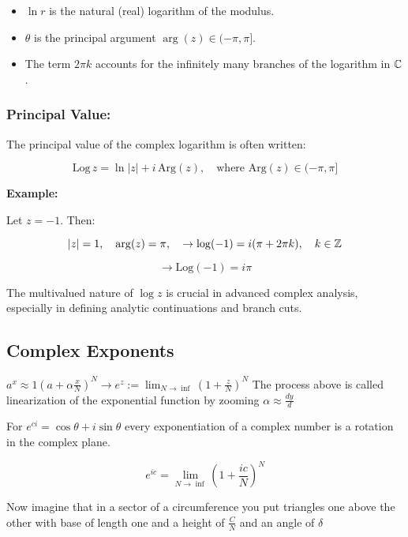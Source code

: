 \begin{itemize}
	
	\item \( \ln r \) is the natural (real) logarithm of the modulus.
	
	\item \( \theta \) is the principal argument \( \arg(z) \in (-\pi, \pi] \).
	
	\item The term \( 2\pi k \) accounts for the infinitely many branches of the logarithm in 
		  \( \mathbb{C} \).

		\end{itemize}

\subsubsection*{Principal Value:}

The principal value of the complex logarithm is often written:

\[
	\mathrm{Log}\,z = \ln |z| + i\,\mathrm{Arg}(z), \quad \text{where } \mathrm{Arg}(z) \in (-\pi, \pi]
\]

\textbf{Example:}

Let \( z = -1 \). Then:

\[
	|z| = 1, \quad \arg(z) = \pi, \quad \to \log(-1) = i(\pi + 2\pi k), \quad k \in \mathbb{Z}
\]

\[
	\to \mathrm{Log}(-1) = i\pi
\]

The multivalued nature of \( \log z \) is crucial in advanced complex analysis, especially in defining 
analytic continuations and branch cuts.

\subsection{Complex Exponents}

\(a^x \approx 1 {\left(a + \alpha \frac{x}{N} \right)}^N \to e^z := \lim_{N \rightarrow \inf} 
{\left( 1 + \frac{z}{N}\right)}^N \) The process above is called linearization of the exponential 
function by zooming  \(\alpha \approx \frac{dy}{d}\)

For  \(e^{ci} = \cos{\theta} + i\sin{\theta}\) every exponentiation of a complex number is a rotation 
in the complex plane.

\[
	e^{ic} = \lim_{N \to \inf} {\left( 1 + \frac{ic}{N}\right)}^N
\]

Now imagine that in a sector of a circumference you put triangles one above the other with base of 
length one and a height of \(\frac{C}{N}\) and 
an angle of \(\delta\)

